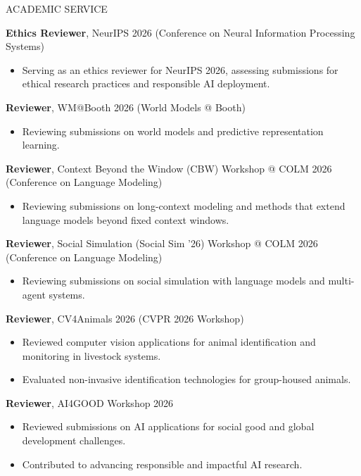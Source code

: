 \documentclass{resume} %
\begin{document}
\begin{rSection}{ACADEMIC SERVICE}

\textbf{Ethics Reviewer}, NeurIPS 2026 (Conference on Neural Information Processing Systems)
\begin{itemize}
    \item Serving as an ethics reviewer for NeurIPS 2026, assessing submissions for ethical research practices and responsible AI deployment.
\end{itemize}

\textbf{Reviewer}, WM@Booth 2026 (World Models @ Booth)
\begin{itemize}
    \item Reviewing submissions on world models and predictive representation learning.
\end{itemize}

\textbf{Reviewer}, Context Beyond the Window (CBW) Workshop @ COLM 2026 (Conference on Language Modeling)
\begin{itemize}
    \item Reviewing submissions on long-context modeling and methods that extend language models beyond fixed context windows.
\end{itemize}

\textbf{Reviewer}, Social Simulation (Social Sim '26) Workshop @ COLM 2026 (Conference on Language Modeling)
\begin{itemize}
    \item Reviewing submissions on social simulation with language models and multi-agent systems.
\end{itemize}

\textbf{Reviewer}, CV4Animals 2026 (CVPR 2026 Workshop)
\begin{itemize}
    \item Reviewed computer vision applications for animal identification and monitoring in livestock systems.
    \item Evaluated non-invasive identification technologies for group-housed animals.
\end{itemize}

\textbf{Reviewer}, AI4GOOD Workshop 2026
\begin{itemize}
    \item Reviewed submissions on AI applications for social good and global development challenges.
    \item Contributed to advancing responsible and impactful AI research.
\end{itemize}


\end{rSection}
\end{document}
